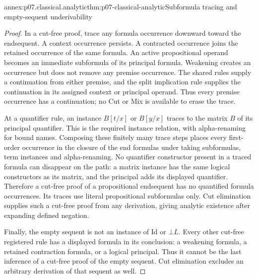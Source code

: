 \begin{annexitem}{annex:p07.classical.analytic}{thm:p07-classical-analytic}{Subformula tracing and empty-sequent underivability}
\begin{proof}
In a cut-free proof, trace any formula occurrence downward toward the
endsequent. A context occurrence persists. A contracted occurrence joins
the retained occurrence of the same formula. An active propositional
operand becomes an immediate subformula of its principal formula.
Weakening creates an occurrence but does not remove any premise
occurrence. The shared rules supply a continuation from either premise,
and the split implication rule supplies the continuation in its assigned
context or principal operand. Thus every premise occurrence has a
continuation; no Cut or Mix is available to erase the trace.

At a quantifier rule, an instance \(B[t/x]\) or \(B[y/x]\) traces to the matrix
\(B\) of its principal quantifier. This is the required instance relation,
with alpha-renaming for bound names. Composing these finitely many trace
steps places every first-order occurrence in the closure of the end
formulas under taking subformulas, term instances and alpha-renaming.
No quantifier constructor present in a traced formula can disappear on
the path: a matrix instance has the same logical constructors as its
matrix, and the principal adds its displayed quantifier. Therefore a
cut-free proof of a propositional endsequent has no quantified formula
occurrences. Its traces use literal propositional subformulas only.
Cut elimination supplies such a cut-free proof from any derivation,
giving analytic existence after expanding defined negation.

Finally, the empty sequent is not an instance of Id or \(\bot L\).
Every other cut-free registered rule has a displayed formula in its
conclusion: a weakening formula, a retained contraction formula, or a
logical principal. Thus it cannot be the last inference of a cut-free
proof of the empty sequent. Cut elimination excludes an arbitrary
derivation of that sequent as well.
\end{proof}
\end{annexitem}

